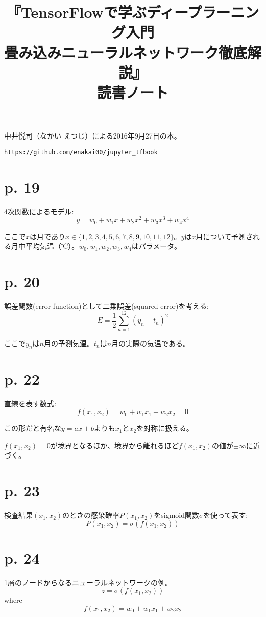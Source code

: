 \documentclass[uplatex,dvipdfmx]{jsarticle} \usepackage{amsmath,amssymb,bm}
\title{『TensorFlowで学ぶディープラーニング入門\\畳み込みニューラルネットワーク徹底解説』\\読書ノート} \author{} \date{}
\begin{document}
\maketitle
中井悦司（なかい えつじ）による2016年9月27日の本。

\verb|https://github.com/enakai00/jupyter_tfbook|



\section*{p. 19}
4次関数によるモデル:
$$ y=w_0+w_1x+w_2x^2+w_3x^3+w_4x^4$$

ここで$x$は月であり$x\in\{1, 2, 3, 4, 5, 6, 7, 8, 9, 10, 11, 12\}$。$y$は$x$月について予測される月中平均気温（℃）。$w_0, w_1, w_2, w_3, w_4$はパラメータ。



\section*{p. 20}
誤差関数(error function)として二乗誤差(squared error)を考える:
$$E=\frac12\sum_{n=1}^{12} (y_n-t_n)^2$$

ここで$y_n$は$n$月の予測気温。$t_n$は$n$月の実際の気温である。



\section*{p. 22}
直線を表す数式:
$$f(x_1,x_2)=w_0+w_1x_1+w_2x_2=0$$

この形だと有名な$y=ax+b$よりも$x_1$と$x_2$を対称に扱える。

$f(x_1,x_2)=0$が境界となるほか、境界から離れるほど$f(x_1,x_2)$の値が$\pm\infty$に近づく。



\section*{p. 23}
検査結果$(x_1,x_2)$のときの感染確率$P(x_1,x_2)$をsigmoid関数$\sigma$を使って表す:
$$P(x_1,x_2)=\sigma(f(x_1,x_2))$$



\section*{p. 24}
1層のノードからなるニューラルネットワークの例。
$$z=\sigma(f(x_1,x_2))$$
where
$$f(x_1,x_2)=w_0+w_1x_1+w_2x_2$$
\end{document}

